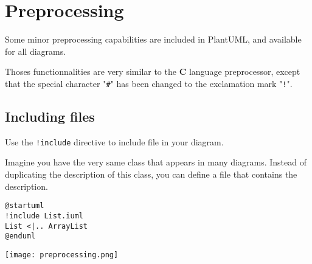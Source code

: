 %
%
% 
%
%
%
%
%
% 

\section{Preprocessing}


Some minor preprocessing capabilities are included in PlantUML, and available for all diagrams. 

Thoses functionnalities are very similar to the \textbf{C} language
preprocessor, except that the special character "\texttt{\#}" has been changed
to the exclamation mark "\texttt{!}".

\subsection{Including files} 

Use the \texttt{!include} directive to include file in your diagram. 

Imagine you have the very same class that appears in many diagrams. Instead of duplicating the 
description of this class, you can define a file that contains the description. 

\begin{lstlisting}
@startuml
!include List.iuml 
List <|.. ArrayList
@enduml 
\end{lstlisting}
\begin{center}
\texttt{[image: preprocessing.png]}
\end{center}


